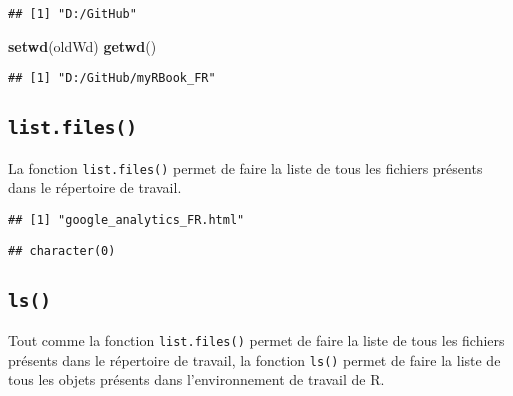 \documentclass[]{book}
\newenvironment{Shaded}{\begin{snugshade}}{\end{snugshade}}
\newcommand{\KeywordTok}[1]{\textcolor[rgb]{0.13,0.29,0.53}{\textbf{#1}}}
\newcommand{\DataTypeTok}[1]{\textcolor[rgb]{0.13,0.29,0.53}{#1}}
\newcommand{\StringTok}[1]{\textcolor[rgb]{0.31,0.60,0.02}{#1}}
\newcommand{\CommentTok}[1]{\textcolor[rgb]{0.56,0.35,0.01}{\textit{#1}}}
\newcommand{\NormalTok}[1]{#1}
\theoremstyle{definition}
\theoremstyle{definition}
\theoremstyle{definition}
\theoremstyle{remark}
\begin{document}
\begin{verbatim}
## [1] "D:/GitHub"
\end{verbatim}

\begin{Shaded}
\begin{Highlighting}[]
\KeywordTok{setwd}\NormalTok{(oldWd)}
\KeywordTok{getwd}\NormalTok{()}
\end{Highlighting}
\end{Shaded}

\begin{verbatim}
## [1] "D:/GitHub/myRBook_FR"
\end{verbatim}

\subsection{\texorpdfstring{\texttt{list.files()}}{list.files()}}\label{l015listfiles}

La fonction \texttt{list.files()} permet de faire la liste de tous les
fichiers présents dans le répertoire de travail.

\begin{Shaded}
\end{Shaded}

\begin{verbatim}
## [1] "google_analytics_FR.html"
\end{verbatim}

\begin{Shaded}
\end{Shaded}

\begin{verbatim}
## character(0)
\end{verbatim}

\subsection{\texorpdfstring{\texttt{ls()}}{ls()}}\label{l015ls}

Tout comme la fonction \texttt{list.files()} permet de faire la liste de
tous les fichiers présents dans le répertoire de travail, la fonction
\texttt{ls()} permet de faire la liste de tous les objets présents dans
l'environnement de travail de R.
\end{document}
